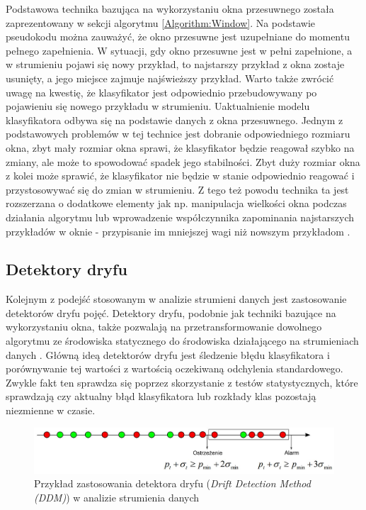 \noindent Podstawowa technika bazująca na wykorzystaniu okna przesuwnego została zaprezentowany w sekcji algorytmu \ref{Algorithm:Window}. Na podstawie pseudokodu można zauważyć, że okno przesuwne jest uzupełniane do momentu pełnego zapełnienia. W sytuacji, gdy okno przesuwne jest w pełni zapełnione, a w strumieniu pojawi się nowy przykład, to najstarszy przykład z okna zostaje usunięty, a jego miejsce zajmuje najświeższy przykład. Warto także zwrócić uwagę na kwestię, że klasyfikator jest odpowiednio przebudowywany po pojawieniu się nowego przykładu w strumieniu. Uaktualnienie modelu klasyfikatora odbywa się na podstawie danych z okna przesuwnego. Jednym z podstawowych problemów w tej technice jest dobranie odpowiedniego rozmiaru okna, zbyt mały rozmiar okna sprawi, że klasyfikator będzie reagował szybko na zmiany, ale może to spowodować spadek jego stabilności. Zbyt duży rozmiar okna z kolei może sprawić, że klasyfikator nie będzie w stanie odpowiednio reagować i przystosowywać się do zmian w strumieniu. Z tego też powodu technika ta jest rozszerzana o dodatkowe elementy jak np. manipulacja wielkości okna podczas działania algorytmu lub wprowadzenie współczynnika zapominania najstarszych przykładów w oknie - przypisanie im mniejszej wagi niż nowszym przykładom \cite{BrzezPhd2015}.

\subsection{Detektory dryfu}

\noindent Kolejnym z podejść stosowanym w analizie strumieni danych jest zastosowanie detektorów dryfu pojęć. Detektory dryfu, podobnie jak techniki bazujące na wykorzystaniu okna, także pozwalają na przetransformowanie dowolnego algorytmu ze środowiska statycznego do środowiska działającego na strumieniach danych \cite{Article:DriftGama2}. Główną ideą detektorów dryfu jest śledzenie błędu klasyfikatora i porównywanie tej wartości z wartością oczekiwaną odchylenia standardowego. Zwykle fakt ten sprawdza się poprzez skorzystanie z testów statystycznych, które sprawdzają czy aktualny błąd klasyfikatora lub rozkłady klas pozostają niezmienne w czasie.

\newpage

\begin{figure}[h] 
    \centering
    \includegraphics[width=15cm]{figures/drift_detection.JPG}
    \caption{Przykład zastosowania detektora dryfu (\textit{Drift Detection Method (DDM)}) w analizie strumienia danych \cite{Prezentacja:Strumienie}}\label{Figure:DriftDetection}
\end{figure}

